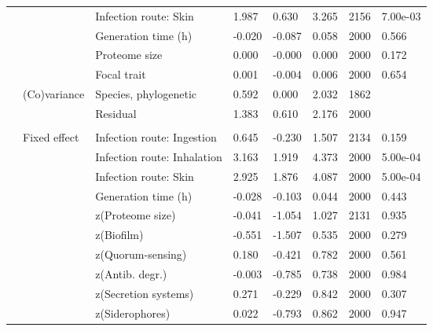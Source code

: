 \begin{table}
\begin{tabular}[t]{llllllll}
\hspace{1em} &  & Infection route: Skin & 1.987 & 0.630 & 3.265 & 2156 & 7.00e-03\\
\hspace{1em} &  & Generation time (h) & -0.020 & -0.087 & 0.058 & 2000 & 0.566\\
\hspace{1em} &  & Proteome size & 0.000 & -0.000 & 0.000 & 2000 & 0.172\\
\hspace{1em} &  & Focal trait & 0.001 & -0.004 & 0.006 & 2000 & 0.654\\
\hspace{1em} & (Co)variance & Species, phylogenetic & 0.592 & 0.000 & 2.032 & 1862 & \\
\hspace{1em} &  & Residual & 1.383 & 0.610 & 2.176 & 2000 & \\
\addlinespace[0.3em]
\multicolumn{8}{l}{\textbf{Multivariate model}}\\
\hspace{1em} & Fixed effect & Infection route: Ingestion & 0.645 & -0.230 & 1.507 & 2134 & 0.159\\
\hspace{1em} &  & Infection route: Inhalation & 3.163 & 1.919 & 4.373 & 2000 & 5.00e-04\\
\hspace{1em} &  & Infection route: Skin & 2.925 & 1.876 & 4.087 & 2000 & 5.00e-04\\
\hspace{1em} &  & Generation time (h) & -0.028 & -0.103 & 0.044 & 2000 & 0.443\\
\hspace{1em} &  & z(Proteome size) & -0.041 & -1.054 & 1.027 & 2131 & 0.935\\
\hspace{1em} &  & z(Biofilm) & -0.551 & -1.507 & 0.535 & 2000 & 0.279\\
\hspace{1em} &  & z(Quorum-sensing) & 0.180 & -0.421 & 0.782 & 2000 & 0.561\\
\hspace{1em} &  & z(Antib. degr.) & -0.003 & -0.785 & 0.738 & 2000 & 0.984\\
\hspace{1em} &  & z(Secretion systems) & 0.271 & -0.229 & 0.842 & 2000 & 0.307\\
\hspace{1em} &  & z(Siderophores) & 0.022 & -0.793 & 0.862 & 2000 & 0.947\\

\end{tabular}
\end{table}
